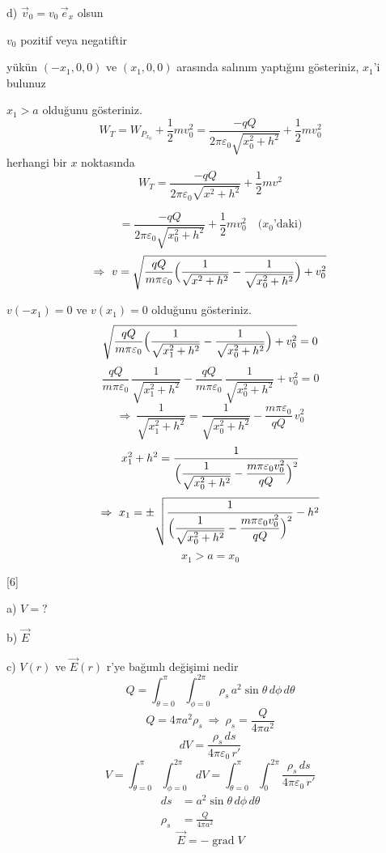 \documentclass[11pt,a4paper]{article}
\begin{document}
\noindent d) $\vec v_0=v_0\,\vec e_x$ olsun

\noindent $v_0$ pozitif veya negatiftir

\noindent yükün $(-x_1,0,0)$ ve $(x_1,0,0)$ arasında salınım yaptığını gösteriniz, $x_1$'i bulunuz

\noindent $x_1>a$ olduğunu gösteriniz.
\[ W_T=W_{P_{x_0}}+\frac{1}{2}mv_0^2=\frac{-qQ}{2\pi\varepsilon_0\sqrt{x_0^2+h^2}}+\frac{1}{2}mv_0^2 \]
\noindent herhangi bir $x$ noktasında
\[ W_T=\frac{-qQ}{2\pi\varepsilon_0\sqrt{x^2+h^2}}+\frac{1}{2}mv^2 \]

\[ =\frac{-qQ}{2\pi\varepsilon_0\sqrt{x_0^2+h^2}}+\frac{1}{2}mv_0^2 \quad\text{($x_0$'daki)} \]
\[ \Rightarrow\ v=\sqrt{\frac{qQ}{m\pi\varepsilon_0}\Bigl(\frac{1}{\sqrt{x^2+h^2}}-\frac{1}{\sqrt{x_0^2+h^2}}\Bigr)+v_0^2} \]

\noindent $v(-x_1)=0$ ve $v(x_1)=0$ olduğunu gösteriniz.
\[ \sqrt{\frac{qQ}{m\pi\varepsilon_0}\Bigl(\frac{1}{\sqrt{x_1^2+h^2}}-\frac{1}{\sqrt{x_0^2+h^2}}\Bigr)+v_0^2}=0 \]
\[ \frac{qQ}{m\pi\varepsilon_0}\,\frac{1}{\sqrt{x_1^2+h^2}}-\frac{qQ}{m\pi\varepsilon_0}\,\frac{1}{\sqrt{x_0^2+h^2}}+v_0^2=0 \]
\[ \Rightarrow\ \frac{1}{\sqrt{x_1^2+h^2}}=\frac{1}{\sqrt{x_0^2+h^2}}-\frac{m\pi\varepsilon_0}{qQ}\,v_0^2 \]
\[ x_1^2+h^2=\frac{1}{\Bigl(\dfrac{1}{\sqrt{x_0^2+h^2}}-\dfrac{m\pi\varepsilon_0 v_0^2}{qQ}\Bigr)^2} \]
\[ \Rightarrow\ x_1=\pm\sqrt{\frac{1}{\Bigl(\dfrac{1}{\sqrt{x_0^2+h^2}}-\dfrac{m\pi\varepsilon_0 v_0^2}{qQ}\Bigr)^2}-h^2} \]
\[ x_1>a=x_0 \]

[6]

\noindent a) $V=?$

\noindent b) $\vec E$

\noindent c) $V(r)$ ve $\vec E(r)$ r'ye bağımlı değişimi nedir
\[ Q=\int_{\theta=0}^{\pi}\int_{\phi=0}^{2\pi}\rho_s\,a^2\sin\theta\,d\phi\,d\theta \]
\[ Q=4\pi a^2\rho_s\ \Rightarrow\ \rho_s=\frac{Q}{4\pi a^2} \]
\[ dV=\frac{\rho_s\,ds}{4\pi\varepsilon_0\,r'} \]
\[ V=\int_{\theta=0}^{\pi}\int_{\phi=0}^{2\pi}dV=\int_{\theta=0}^{\pi}\int_{0}^{2\pi}\frac{\rho_s\,ds}{4\pi\varepsilon_0\,r'} \]
\begin{align*}
  ds &= a^2\sin\theta\,d\phi\,d\theta \\
  \rho_s &= \frac{Q}{4\pi a^2}
\end{align*}
\[ \vec E=-\operatorname{grad}V \]
\end{document}
